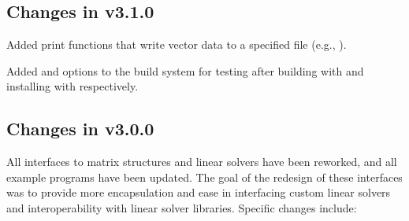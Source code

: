 \subsection*{Changes in v3.1.0}

Added {\nvector} print functions that write vector data to a specified
file (e.g., ).

Added  and  options to the build
system for testing {\sundials} after building with  and
installing with  respectively.

\subsection*{Changes in v3.0.0}

All interfaces to matrix structures and linear solvers 
have been reworked, and all example programs have been updated. 
The goal of the redesign of these interfaces was to provide more encapsulation
and ease in interfacing custom linear solvers and interoperability 
with linear solver libraries.
Specific changes include:
